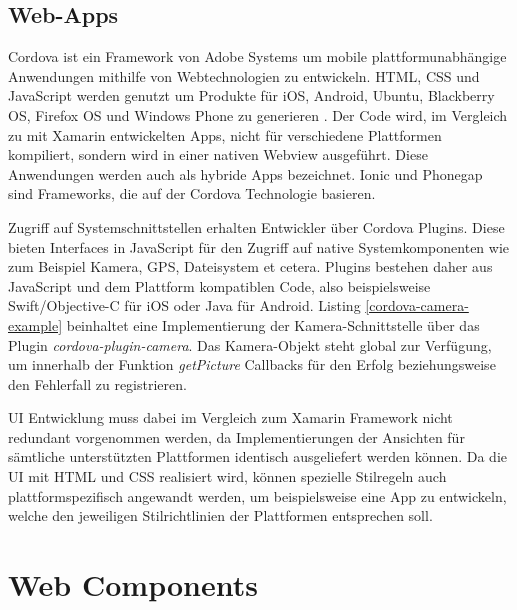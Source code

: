 \newpage


\subsection{Web-Apps}

Cordova ist ein Framework von Adobe Systems um mobile plattformunabhängige Anwendungen mithilfe von Webtechnologien zu entwickeln.
\ac{HTML}, \ac{CSS} und JavaScript werden genutzt um Produkte für iOS, Android, Ubuntu, Blackberry OS, Firefox OS und Windows Phone zu generieren \cite{Cordo26:online}.
Der Code wird, im Vergleich zu mit Xamarin entwickelten Apps, nicht für verschiedene Plattformen kompiliert,
sondern wird in einer nativen Webview ausgeführt. Diese Anwendungen werden auch als hybride Apps bezeichnet.
Ionic und Phonegap sind Frameworks, die auf der Cordova Technologie basieren.

Zugriff auf Systemschnittstellen erhalten Entwickler über Cordova Plugins. Diese bieten
Interfaces in JavaScript für den Zugriff auf native Systemkomponenten wie zum Beispiel Kamera, GPS, Dateisystem et cetera.
Plugins bestehen daher aus JavaScript und dem Plattform kompatiblen Code,
also beispielsweise Swift/Objective-C für iOS oder Java für Android.
Listing \ref{cordova-camera-example} beinhaltet eine Implementierung der Kamera-Schnittstelle über das Plugin \emph{cordova-plugin-camera}.
Das Kamera-Objekt steht global zur Verfügung, um innerhalb der Funktion \emph{getPicture} Callbacks für den Erfolg beziehungsweise den Fehlerfall zu registrieren.

\ac{UI} Entwicklung muss dabei im Vergleich zum Xamarin Framework nicht redundant vorgenommen werden, da Implementierungen der
Ansichten für sämtliche unterstützten Plattformen identisch ausgeliefert werden können.
Da die \ac{UI} mit \ac{HTML} und \ac{CSS} realisiert wird,
können spezielle Stilregeln auch plattformspezifisch angewandt werden, um beispielsweise eine App zu entwickeln,
welche den jeweiligen Stilrichtlinien der Plattformen entsprechen soll.

\vspace{0.3cm}

\vspace{0.3cm}

\newpage
\section{Web Components}
\label{sec:webcomponents}


